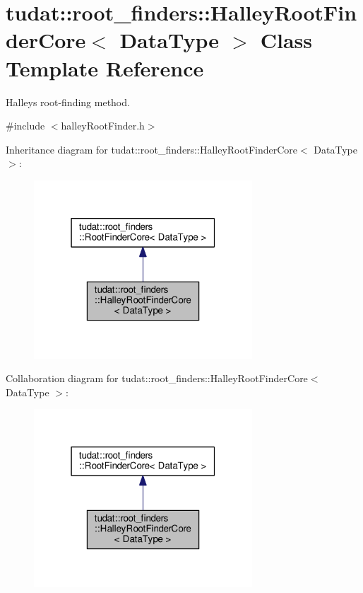 \hypertarget{classtudat_1_1root__finders_1_1HalleyRootFinderCore}{}\section{tudat\+:\+:root\+\_\+finders\+:\+:Halley\+Root\+Finder\+Core$<$ Data\+Type $>$ Class Template Reference}
\label{classtudat_1_1root__finders_1_1HalleyRootFinderCore}


Halley\textquotesingle{}s root-\/finding method.  




{\ttfamily \#include $<$halley\+Root\+Finder.\+h$>$}



Inheritance diagram for tudat\+:\+:root\+\_\+finders\+:\+:Halley\+Root\+Finder\+Core$<$ Data\+Type $>$\+:
\nopagebreak
\begin{figure}[H]
\begin{center}
\leavevmode
\includegraphics[width=232pt]{classtudat_1_1root__finders_1_1HalleyRootFinderCore__inherit__graph}
\end{center}
\end{figure}


Collaboration diagram for tudat\+:\+:root\+\_\+finders\+:\+:Halley\+Root\+Finder\+Core$<$ Data\+Type $>$\+:
\nopagebreak
\begin{figure}[H]
\begin{center}
\leavevmode
\includegraphics[width=232pt]{classtudat_1_1root__finders_1_1HalleyRootFinderCore__coll__graph}
\end{center}
\end{figure}
